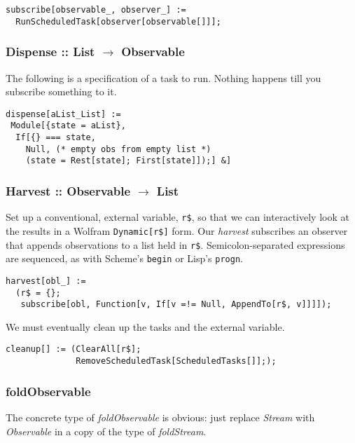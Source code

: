 \documentclass[10pt,oneside,x11names]{article}
\begin{document}
\begin{verbatim}
subscribe[observable_, observer_] :=
  RunScheduledTask[observer[observable[]]];
\end{verbatim}

\subsubsection{Dispense :: List \(\rightarrow\) Observable}
\label{sec:orgheadline11}

The following is a specification of a task to run. Nothing happens till you
subscribe something to it. 

\begin{verbatim}
dispense[aList_List] :=
 Module[{state = aList},
  If[{} === state,
    Null, (* empty obs from empty list *)
    (state = Rest[state]; First[state]]);] &]
\end{verbatim}

\subsubsection{Harvest :: Observable \(\rightarrow\) List}
\label{sec:orgheadline12}

Set up a conventional, external variable, \texttt{r\$}, so that we can interactively
look at the results in a Wolfram \texttt{Dynamic[r\$]} form. Our \emph{harvest} 
subscribes an observer that appends observations to a list held in \texttt{r\$}.
Semicolon-separated expressions are sequenced, as with Scheme's \texttt{begin} or
Lisp's \texttt{progn}.

\begin{verbatim}
harvest[obl_] :=
  (r$ = {};
   subscribe[obl, Function[v, If[v =!= Null, AppendTo[r$, v]]]]);
\end{verbatim}

We must eventually clean up the tasks and the external variable.

\begin{verbatim}
cleanup[] := (ClearAll[r$];
              RemoveScheduledTask[ScheduledTasks[]];);
\end{verbatim}

\subsubsection{foldObservable}
\label{sec:orgheadline13}

The concrete type of \emph{foldObservable} is obvious: just replace \emph{Stream} with
\emph{Observable} in a copy of the type of \emph{foldStream}.
\end{document}
